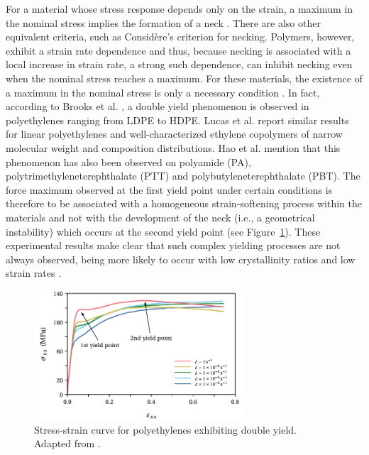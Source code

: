 For a material whose stress response depends only on the strain, a maximum in the nominal stress implies the formation of a neck \citep{wardIntroductionMechanicalProperties2004}.
There are also other equivalent criteria, such as Considère's criterion for necking.
Polymers, however, exhibit a strain rate dependence and thus, because necking is associated with a local increase in strain rate, a strong such dependence, can inhibit necking even when the nominal stress reaches a maximum.
For these materials, the existence of a maximum in the nominal stress is only a necessary condition \citep{wardIntroductionMechanicalProperties2004}.
In fact, according to Brooks et al. \citep{brooksModelingDoubleYield1995}, a double yield phenomenon is observed in polyethylenes ranging from LDPE to HDPE.
Lucas et al. \cite{lucasDoubleYieldTensile1995} report similar results for linear polyethylenes and well-characterized ethylene copolymers of narrow molecular weight and composition distributions.
Hao et al. \citep{haoRatedependentConstitutiveModel2022} mention that this phenomenon has also been observed on polyamide (PA), polytrimethyleneterephthalate (PTT) and polybutyleneterephthalate (PBT).
The force maximum observed at the first yield point under certain conditions is therefore to be associated with a homogeneous strain-softening process within the materials and not with the development of the neck (i.e., a geometrical instability) which occurs at the second yield point (see Figure~\ref{fig:double_yield}).
These experimental results make clear that such complex yielding processes are not always observed, being more likely to occur with low crystallinity ratios and low strain rates \citep{zengConstitutiveModelSemicrystalline2010}.
\begin{figure}[htbp]
	\centering
	\includegraphics[width=0.7\textwidth]{figures/double_yield}
	\caption{Stress-strain curve for polyethylenes exhibiting double yield. Adapted from \cite{haoRatedependentConstitutiveModel2022}.}
\label{fig:double_yield}
\end{figure}

